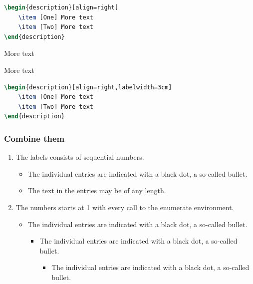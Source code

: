 \documentclass{article}				%
\begin{document}
\begin{lstlisting}[language=tex,frame=single]
\begin{description}[align=right]
	\item [One] More text
	\item [Two] More text
\end{description}
\end{lstlisting}

\begin{description}[align=right,labelwidth=3cm]
	\item [One right] More text
	\item [Two right] More text
\end{description}

\begin{lstlisting}[language=tex,frame=single]
\begin{description}[align=right,labelwidth=3cm]
	\item [One] More text
	\item [Two] More text
\end{description}
\end{lstlisting}

\subsubsection{Combine them}

\begin{enumerate}
	\item The labels consists of sequential numbers.
	\begin{itemize}
		\item The individual entries are indicated with a black dot, a so-called bullet.
		\item The text in the entries may be of any length.
	\end{itemize}
	\item The numbers starts at 1 with every call to the enumerate environment.
	\begin{itemize}
		\item The individual entries are indicated with a black dot, a so-called bullet.
		\begin{itemize}
			\item The individual entries are indicated with a black dot, a so-called bullet.
			\begin{itemize}
				\item The individual entries are indicated with a black dot, a so-called bullet.
			\end{itemize}
		\end{itemize}
	\end{itemize}
\end{enumerate}
\end{document}
